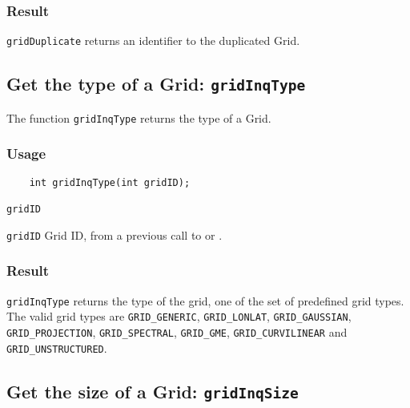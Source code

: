 \subsubsection*{Result}

{\texttt{gridDuplicate}} returns an identifier to the duplicated Grid.



\subsection{Get the type of a Grid: \texttt{gridInqType}}
\label{gridInqType}

The function {\texttt{gridInqType}} returns the type of a Grid.

\subsubsection*{Usage}

\begin{verbatim}
    int gridInqType(int gridID);
\end{verbatim}

\hspace*{4mm}\begin{minipage}[]{15cm}
\begin{deflist}{\texttt{gridID}\ }
\item[\texttt{gridID}]
Grid ID, from a previous call to {} or {}.

\end{deflist}
\end{minipage}

\subsubsection*{Result}

{\texttt{gridInqType}} returns the type of the grid,
one of the set of predefined {\CDI} grid types.
The valid {\CDI} grid types are {\texttt{GRID\_GENERIC}}, {\texttt{GRID\_LONLAT}},
{\texttt{GRID\_GAUSSIAN}}, {\texttt{GRID\_PROJECTION}}, {\texttt{GRID\_SPECTRAL}}, {\texttt{GRID\_GME}},
{\texttt{GRID\_CURVILINEAR}} and {\texttt{GRID\_UNSTRUCTURED}}.



\subsection{Get the size of a Grid: \texttt{gridInqSize}}
\label{gridInqSize}

